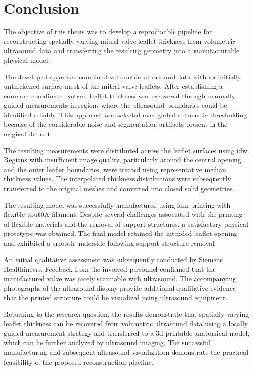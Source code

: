\chapter{Conclusion}\label{chap:conclusion}

The objective of this thesis was to develop a reproducible pipeline for reconstructing spatially varying mitral valve leaflet thickness from volumetric ultrasound data and transferring the resulting geometry into a manufacturable physical model.

The developed approach combined volumetric ultrasound data with an initially unthickened surface mesh of the mitral valve leaflets. After establishing a common coordinate system, leaflet thickness was recovered through manually guided measurements in regions where the ultrasound boundaries could be identified reliably. This approach was selected over global automatic thresholding because of the considerable noise and segmentation artifacts present in the original dataset.

The resulting measurements were distributed across the leaflet surfaces using \gls{idw}. Regions with insufficient image quality, particularly around the central opening and the outer leaflet boundaries, were treated using representative median thickness values. The interpolated thickness distributions were subsequently transferred to the original meshes and converted into closed solid geometries.

The resulting model was successfully manufactured using \gls{fdm} printing with flexible \gls{tpu}60A filament. Despite several challenges associated with the printing of flexible materials and the removal of support structures, a satisfactory physical prototype was obtained. The final model retained the intended leaflet opening and exhibited a smooth underside following support structure removal.

An initial qualitative assessment was subsequently conducted by Siemens Healthineers. Feedback from the involved personnel confirmed that the manufactured valve was nicely scannable with ultrasound. The accompanying photographs of the ultrasound display provide additional qualitative evidence that the printed structure could be visualized using ultrasound equipment.

Returning to the research question, the results demonstrate that spatially varying leaflet thickness can be recovered from volumetric ultrasound data using a locally guided measurement strategy and transferred to a \gls{3d}-printable anatomical model, which can be further analyzed by ultrasound imaging. The successful manufacturing and subsequent ultrasound visualization demonstrate the practical feasibility of the proposed reconstruction pipeline.

